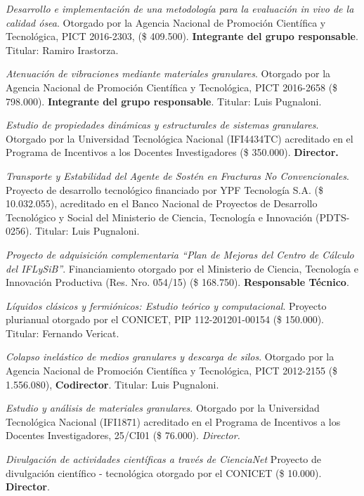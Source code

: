  \textit{Desarrollo e implementación de una metodología para la evaluación \textit{in vivo} de la calidad ósea}. Otorgado por la Agencia Nacional de Promoción Científica y Tecnológica, PICT 2016-2303, (\$ 409.500). \textbf{Integrante del grupo responsable}. Titular: Ramiro Irastorza.

 \textit{Atenuación de vibraciones mediante materiales granulares}. Otorgado por la Agencia Nacional de Promoción Científica y Tecnológica, PICT 2016-2658 (\$ 798.000). \textbf{Integrante del grupo responsable}. Titular: Luis Pugnaloni.

 \textit{Estudio de propiedades dinámicas y estructurales de sistemas granulares}. Otorgado por la Universidad Tecnológica Nacional (IFI4434TC) acreditado en el Programa de Incentivos a los Docentes Investigadores (\$ 350.000). \textbf{Director.}

 \textit{Transporte y Estabilidad del Agente de Sostén en Fracturas No Convencionales}. Proyecto de desarrollo tecnológico financiado por YPF Tecnología S.A. (\$ 10.032.055), acreditado en el Banco Nacional de Proyectos de Desarrollo Tecnológico y Social del Ministerio de Ciencia, Tecnología e Innovación (PDTS-0256). Titular: Luis Pugnaloni.

 \textit{Proyecto de adquisición complementaria ``Plan de Mejoras del Centro de Cálculo del IFLySiB''}. Financiamiento otorgado por el Ministerio de Ciencia, Tecnología e Innovación Productiva (Res. Nro. 054/15) (\$ 168.750). \textbf{Responsable Técnico}.

  \textit{Líquidos clásicos y fermiónicos: Estudio teórico y computacional}. Proyecto plurianual otorgado por el CONICET, PIP 112-201201-00154 (\$ 150.000). Titular: Fernando Vericat.
\pagebreak

 \textit{Colapso inelástico de medios granulares y descarga de silos}. Otorgado por la Agencia Nacional de Promoción Científica y Tecnológica, PICT 2012-2155 (\$ 1.556.080), \textbf{Codirector}. Titular: Luis Pugnaloni.

 \textit{Estudio y análisis de materiales granulares}. Otorgado por la Universidad Tecnológica Nacional (IFI1871) acreditado en el Programa de Incentivos a los Docentes Investigadores, 25/CI01 (\$ 76.000). \textit{Director.}

 \textit{Divulgación de actividades científicas a través de CienciaNet} Proyecto de divulgación científico - tecnológica otorgado por el CONICET (\$ 10.000). \textbf{Director}.

